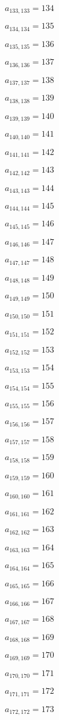 \documentclass[a4paper,12pt]{article}
\begin{document}
$a _{ 133, 133 } = 134$

$a _{ 134, 134 } = 135$

$a _{ 135, 135 } = 136$

$a _{ 136, 136 } = 137$

$a _{ 137, 137 } = 138$

$a _{ 138, 138 } = 139$

$a _{ 139, 139 } = 140$

$a _{ 140, 140 } = 141$

$a _{ 141, 141 } = 142$

$a _{ 142, 142 } = 143$

$a _{ 143, 143 } = 144$

$a _{ 144, 144 } = 145$

$a _{ 145, 145 } = 146$

$a _{ 146, 146 } = 147$

$a _{ 147, 147 } = 148$

$a _{ 148, 148 } = 149$

$a _{ 149, 149 } = 150$

$a _{ 150, 150 } = 151$

$a _{ 151, 151 } = 152$

$a _{ 152, 152 } = 153$

$a _{ 153, 153 } = 154$

$a _{ 154, 154 } = 155$

$a _{ 155, 155 } = 156$

$a _{ 156, 156 } = 157$

$a _{ 157, 157 } = 158$

$a _{ 158, 158 } = 159$

$a _{ 159, 159 } = 160$

$a _{ 160, 160 } = 161$

$a _{ 161, 161 } = 162$

$a _{ 162, 162 } = 163$

$a _{ 163, 163 } = 164$

$a _{ 164, 164 } = 165$

$a _{ 165, 165 } = 166$

$a _{ 166, 166 } = 167$

$a _{ 167, 167 } = 168$

$a _{ 168, 168 } = 169$

$a _{ 169, 169 } = 170$

$a _{ 170, 170 } = 171$

$a _{ 171, 171 } = 172$

$a _{ 172, 172 } = 173$
\end{document}
